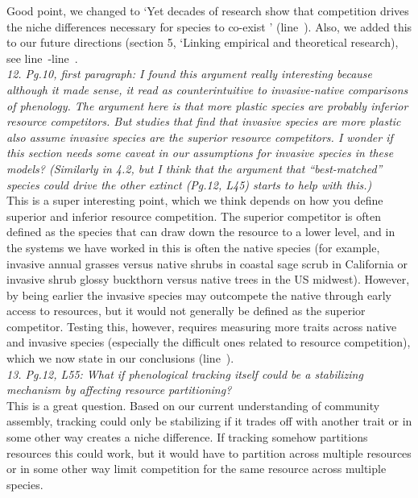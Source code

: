 \documentclass[11pt]{article}
\newcommand{\lr}[1]{line~\lineref{#1}}
\begin{document}
Good point, we changed to `Yet decades of research show that competition drives the niche differences necessary for species to co-exist \citep{Hutchinson:1959xi,Chesson:2000vd}' (\lr{r2whycomp}). Also, we added this to our future directions (section 5, `Linking empirical and theoretical research), see \lr{r2exp}-\lr{r2expend}.\\

\emph{12.     Pg.10, first paragraph: I found this argument really interesting because although it
made sense, it read as counterintuitive to invasive-native comparisons of phenology. The
argument here is that more plastic species are probably inferior resource competitors. But
studies that find that invasive species are more plastic also assume invasive species are the
superior resource competitors. I wonder if this section needs some caveat in our assumptions
for invasive species in these models? (Similarly in 4.2, but I think that the argument that
``best-matched'' species could drive the other extinct (Pg.12, L45) starts to help with this.)}\\

This is a super interesting point, which we think depends on how you define superior and inferior resource competition. The superior competitor is often defined as the species that can draw down the resource to a lower level, and in the systems we have worked in this is often the native species (for example, invasive annual grasses versus native shrubs in coastal sage scrub in California or invasive shrub glossy buckthorn versus native trees in the US midwest). However, by being earlier the invasive species may outcompete the native through early access to resources, but it would not generally be defined as the superior competitor. Testing this, however, requires measuring more traits across native and invasive species (especially the difficult ones related to resource competition), which we now state in our conclusions (\lr{r2invas}).\\

\emph{13.     Pg.12, L55: What if phenological tracking itself could be a stabilizing mechanism by
affecting resource partitioning?}\\

This is a great question. Based on our current understanding of community assembly, tracking could only be stabilizing if it trades off with another trait or in some other way creates a niche difference. If tracking somehow partitions resources this could work, but it would have to partition across multiple resources or in some other way limit competition for the same resource across multiple species. \\
\end{document}

